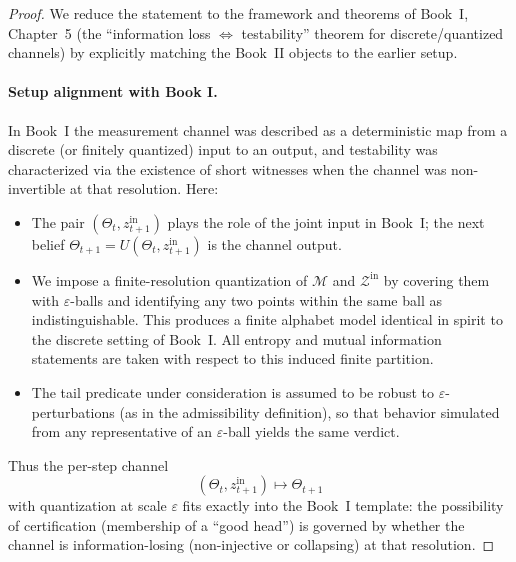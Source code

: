 \documentclass[12pt]{article}
\theoremstyle{definition}
\theoremstyle{plain}
\begin{document}
\begin{proof}
We reduce the statement to the framework and theorems of Book~I, Chapter~5 (the “information loss \(\Leftrightarrow\) testability” theorem for discrete/quantized channels) by explicitly matching the Book~II objects to the earlier setup.

\paragraph{Setup alignment with Book I.}  
In Book~I the measurement channel was described as a deterministic map from a discrete (or finitely quantized) input to an output, and testability was characterized via the existence of short witnesses when the channel was non-invertible at that resolution. Here:
\begin{itemize}
    \item The pair \((\Theta_t,z_{t+1}^{\mathrm{in}})\) plays the role of the joint input in Book~I; the next belief \(\Theta_{t+1}=U(\Theta_t,z_{t+1}^{\mathrm{in}})\) is the channel output.
    \item We impose a finite-resolution quantization of \(\mathcal{M}\) and \(\mathcal{Z}^{\mathrm{in}}\) by covering them with \(\varepsilon\)-balls and identifying any two points within the same ball as indistinguishable. This produces a finite alphabet model identical in spirit to the discrete setting of Book~I. All entropy and mutual information statements are taken with respect to this induced finite partition. 
    \item The tail predicate under consideration is assumed to be robust to \(\varepsilon\)-perturbations (as in the admissibility definition), so that behavior simulated from any representative of an \(\varepsilon\)-ball yields the same verdict.
\end{itemize}

Thus the per-step channel
\[
(\Theta_t,z_{t+1}^{\mathrm{in}})\longmapsto \Theta_{t+1}
\]
with quantization at scale \(\varepsilon\) fits exactly into the Book~I template: the possibility of certification (membership of a “good head”) is governed by whether the channel is information-losing (non-injective or collapsing) at that resolution.


\end{proof}
\end{document}
